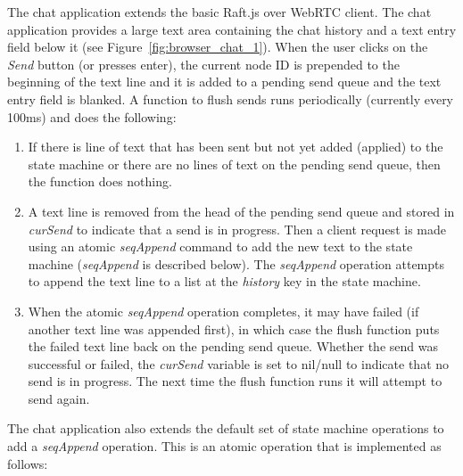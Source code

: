 \documentclass[9pt]{extarticle}
\begin{document}
\begin{multicols}{2}
The chat application extends the basic Raft.js over WebRTC client. The
chat application provides a large text area containing the chat
history and a text entry field below it
(see Figure~\ref{fig:browser_chat_1}). When the user clicks on the
\emph{Send} button (or presses enter), the current node ID is
prepended to the beginning of the text line and it is added to
a pending send queue and the text entry field is blanked. A function
to flush sends runs periodically (currently every 100ms) and does the
following:

\begin{enumerate}
\item If there is line of text that has been sent but not yet
    added (applied) to the state machine or there are no lines of text
    on the pending send queue, then the function does nothing.
\item A text line is removed from the head of the pending send queue
    and stored in \emph{curSend} to indicate that a send is in
    progress. Then a client request is made using an atomic
    \emph{seqAppend} command to add the new text to the state machine
    (\emph{seqAppend} is described below).  The \emph{seqAppend}
    operation attempts to append the text line to a list at the
    \emph{history} key in the state machine.
\item When the atomic \emph{seqAppend} operation completes, it may
    have failed (if another text line was appended first), in which
    case the flush function puts the failed text line back on the
    pending send queue. Whether the send was successful or failed, the
    \emph{curSend} variable is set to nil/null to indicate that no
    send is in progress. The next time the flush function runs it will
    attempt to send again. %
\end{enumerate}


The chat application also extends the default set of state machine
operations to add a \emph{seqAppend} operation. This is an atomic
operation that is implemented as follows:


\end{multicols}
\end{document}
